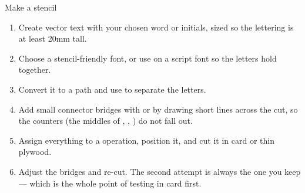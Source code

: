 \begin{tryit}{Make a stencil}
\begin{enumerate}[label=\arabic*.,leftmargin=1.4em]
  \item Create vector text with your chosen word or initials, sized so the
        lettering is at least 20\unit{mm} tall.
  \item Choose a stencil-friendly font, or use  on a script font so
        the letters hold together.
  \item Convert it to a path and use  to separate the
        letters.
  \item Add small connector bridges with  or by drawing short lines
        across the cut, so the counters (the middles of , , )
        do not fall out.
  \item Assign everything to a  operation, position it, and
        cut it in card or thin plywood.
  \item Adjust the bridges and re-cut. The second attempt is always the one you
        keep --- which is the whole point of testing in card first.
\end{enumerate}
\end{tryit}
